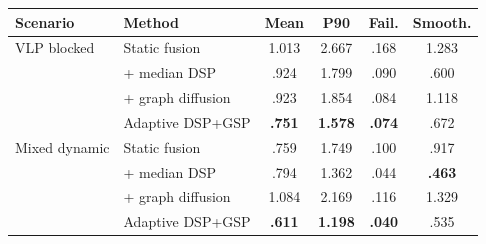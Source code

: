 \begin{tabular}{@{}llcccc@{}}
\toprule
Scenario & Method & Mean & P90 & Fail. & Smooth. \\
\midrule
VLP blocked & Static fusion & 1.013 & 2.667 & .168 & 1.283 \\
 & + median DSP & .924 & 1.799 & .090 & .600 \\
 & + graph diffusion & .923 & 1.854 & .084 & 1.118 \\
 & Adaptive DSP+GSP & \textbf{.751} & \textbf{1.578} & \textbf{.074} & .672 \\
\midrule
Mixed dynamic & Static fusion & .759 & 1.749 & .100 & .917 \\
 & + median DSP & .794 & 1.362 & .044 & \textbf{.463} \\
 & + graph diffusion & 1.084 & 2.169 & .116 & 1.329 \\
 & Adaptive DSP+GSP & \textbf{.611} & \textbf{1.198} & \textbf{.040} & .535 \\
\bottomrule
\end{tabular}
